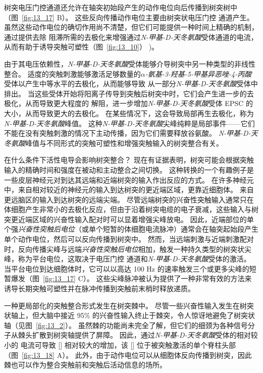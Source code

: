 树突电压门控通道还允许在轴突初始段产生的动作电位向后传播到树突树中（图~\ref{fig:13_17} B）。
这些反向传播动作电位主要由树突状电压门控  通道产生。
虽然这些动作电位的确切作用尚不清楚，但它们可能提供一种时间上精确的机制，通过提供去除  阻滞所需的去极化来增强通过\textit{N-甲基-D-天冬氨酸}受体通道的电流，从而有助于诱导突触可塑性（图~\ref{fig:13_10}） )。


由于其电压依赖性，\textit{N-甲基-D-天冬氨酸}受体能够介导树突中另一种类型的非线性整合。
适度的突触刺激能够激活足够数量的\textit{$\alpha$-氨基-3-羟基-5-甲基异恶唑-4-丙酸}受体以产生中等水平的去极化，从而能够导致  从一部分\textit{N-甲基-D-天冬氨酸}受体中排出。
当这些受体开始将阳离子传导到突触后树突中时，它们会产生进一步的去极化，从而导致更大程度的  解阻，进一步增加\textit{N-甲基-D-天冬氨酸}受体 EPSC 的大小，从而导致更大的去极化。
在某些情况下，这会导致局部再生去极化，称为\textit{N-甲基-D-天冬氨酸}峰值。
这种\textit{N-甲基-D-天冬氨酸}尖峰纯粹是局部事件——它们不能在没有突触刺激的情况下主动传播，因为它们需要释放谷氨酸。
\textit{N-甲基-D-天冬氨酸}峰值与不同形式的突触可塑性和增强突触输入的树突整合有关。


在什么条件下活性电导会影响树突整合？
现在有证据表明，树突可能会根据突触输入的精确时间和强度在被动和主动整合之间切换。
这种转换的一个有趣例子是一些皮层神经元对到达其远端和近端树突的输入作出反应的方式。
在许多神经元中，来自相对较近的神经元的输入到达树突的更近端区域，更靠近细胞体。
来自更远脑区的输入到达树突的远端尖端。
尽管远端树突的兴奋性突触输入通常只在体细胞产生非常小的去极化反应，但由于沿着树突电缆的电子衰减，这些输入与树突更近端区域的兴奋性输入配对时可以显着增强尖峰放电。
因此，近端部位的单个强\textit{兴奋性突触后电位}（或单个短暂的体细胞电流脉冲）通常会在轴突起始段产生单个动作电位，然后可以反向传播到树突中。
然而，当远端刺激与近端刺激配对时，反向传播尖峰与远端\textit{兴奋性突触后电位}相加，触发一种持久类型的树突状尖峰，称为平台电位，这取决于电压门控  通道和\textit{N-甲基-D-天冬氨酸}受体的激活。
当平台电位到达细胞体时，它可以以高达 100 Hz 的速率触发三个或更多尖峰的短暂爆发（图~\ref{fig:13_17} C）。
这些尖峰脉冲被认为提供了一种非常有效的方法来诱导长期突触可塑性并在脉冲传播到突触前末梢时释放递质。


一种更局部化的突触整合形式发生在树突棘中。
尽管一些兴奋性输入发生在树突状轴上，但大脑中接近 95\% 的兴奋性输入终止于棘突，令人惊讶地避免了树突状轴（见图~\ref{fig:13_2}）。
虽然棘的功能尚未完全了解，但它们的细颈为各种信号分子从棘头扩散到树突轴提供了屏障。
因此，通过\textit{N-甲基-D-天冬氨酸}受体的相对较小的  电流可导致 [] 相对较大的增加，该 [] 位于被突触激活的单个脊柱头部（图~\ref{fig:13_18} A）。
此外，由于动作电位可以从细胞体反向传播到树突，因此棘也可以作为整合突触前和突触后活动信息的场所。


